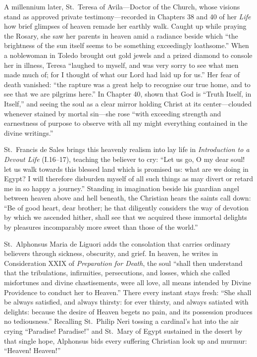 A millennium later, St.\ Teresa of Avila---Doctor of the Church, whose visions stand as approved private testimony---recorded in Chapters 38 and 40 of her \textit{Life} how brief glimpses of heaven remade her earthly walk. Caught up while praying the Rosary, she saw her parents in heaven amid a radiance beside which ``the brightness of the sun itself seems to be something exceedingly loathsome.'' When a noblewoman in Toledo brought out gold jewels and a prized diamond to console her in illness, Teresa ``laughed to myself, and was very sorry to see what men made much of; for I thought of what our Lord had laid up for us.'' Her fear of death vanished: ``the rapture was a great help to recognise our true home, and to see that we are pilgrims here.'' In Chapter 40, shown that God is ``Truth Itself, in Itself,'' and seeing the soul as a clear mirror holding Christ at its center---clouded whenever stained by mortal sin---she rose ``with exceeding strength and earnestness of purpose to observe with all my might everything contained in the divine writings.''

St.\ Francis de Sales brings this heavenly realism into lay life in \textit{Introduction to a Devout Life} (I.16--17), teaching the believer to cry: ``Let us go, O my dear soul! let us walk towards this blessed land which is promised us: what are we doing in Egypt? I will therefore disburden myself of all such things as may divert or retard me in so happy a journey.'' Standing in imagination beside his guardian angel between heaven above and hell beneath, the Christian hears the saints call down: ``Be of good heart, dear brother; he that diligently considers the way of devotion by which we ascended hither, shall see that we acquired these immortal delights by pleasures incomparably more sweet than those of the world.''

St.\ Alphonsus Maria de Liguori adds the consolation that carries ordinary believers through sickness, obscurity, and grief. In heaven, he writes in Consideration XXIX of \textit{Preparation for Death}, the soul ``shall then understand that the tribulations, infirmities, persecutions, and losses, which she called misfortunes and divine chastisements, were all love, all means intended by Divine Providence to conduct her to Heaven.'' There every instant stays fresh: ``She shall be always satisfied, and always thirsty: for ever thirsty, and always satiated with delights: because the desire of Heaven begets no pain, and its possession produces no tediousness.'' Recalling St.\ Philip Neri tossing a cardinal's hat into the air crying ``Paradise! Paradise!'' and St.\ Mary of Egypt sustained in the desert by that single hope, Alphonsus bids every suffering Christian look up and murmur: ``Heaven! Heaven!''

